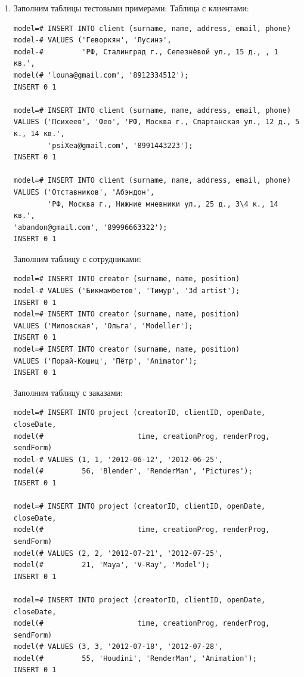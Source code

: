\documentclass[a4paper, 12pt, titlepage]{article}
\begin{document}
\begin{otherlanguage}{russian}
\begin{enumerate}
\newpage

\item Заполним таблицы тестовыми примерами:
Таблица с клиентами:
{\small
\begin{verbatim}
model=# INSERT INTO client (surname, name, address, email, phone)
model-# VALUES ('Геворкян', 'Лусинэ', 
model-#         'РФ, Сталинград г., Селезнёвой ул., 15 д., , 1 кв.', 
model(# 'louna@gmail.com', '8912334512');
INSERT 0 1

model=# INSERT INTO client (surname, name, address, email, phone)
VALUES ('Психеев', 'Фео', 'РФ, Москва г., Спартанская ул., 12 д., 5 к., 14 кв.', 
        'psiXea@gmail.com', '8991443223');
INSERT 0 1

model=# INSERT INTO client (surname, name, address, email, phone)
VALUES ('Отставников', 'Абэндон', 
        'РФ, Москва г., Нижние мневники ул., 25 д., 3\4 к., 14 кв.',   
'abandon@gmail.com', '89996663322');
INSERT 0 1
\end{verbatim}}

Заполним таблицу с сотрудниками:
{\small
\begin{verbatim}
model=# INSERT INTO creator (surname, name, position)
model-# VALUES ('Бикмамбетов', 'Тимур', '3d artist');
INSERT 0 1
model=# INSERT INTO creator (surname, name, position)
VALUES ('Миловская', 'Ольга', 'Modeller');
INSERT 0 1
model=# INSERT INTO creator (surname, name, position)
VALUES ('Порай-Кошиц', 'Пётр', 'Animator');
INSERT 0 1
\end{verbatim}}

Заполним таблицу с заказами:
{\small
\begin{verbatim}
model=# INSERT INTO project (creatorID, clientID, openDate, closeDate,
model(#                      time, creationProg, renderProg, sendForm)
model-# VALUES (1, 1, '2012-06-12', '2012-06-25',
model(#         56, 'Blender', 'RenderMan', 'Pictures');
INSERT 0 1

model=# INSERT INTO project (creatorID, clientID, openDate, closeDate,
model(#                      time, creationProg, renderProg, sendForm)
model(# VALUES (2, 2, '2012-07-21', '2012-07-25',
model(#         21, 'Maya', 'V-Ray', 'Model');
INSERT 0 1

model=# INSERT INTO project (creatorID, clientID, openDate, closeDate,
model(#                      time, creationProg, renderProg, sendForm)
model(# VALUES (3, 3, '2012-07-18', '2012-07-28',
model(#         55, 'Houdini', 'RenderMan', 'Animation');
INSERT 0 1
\end{verbatim}}


\end{enumerate}
\end{otherlanguage}
\end{document}
